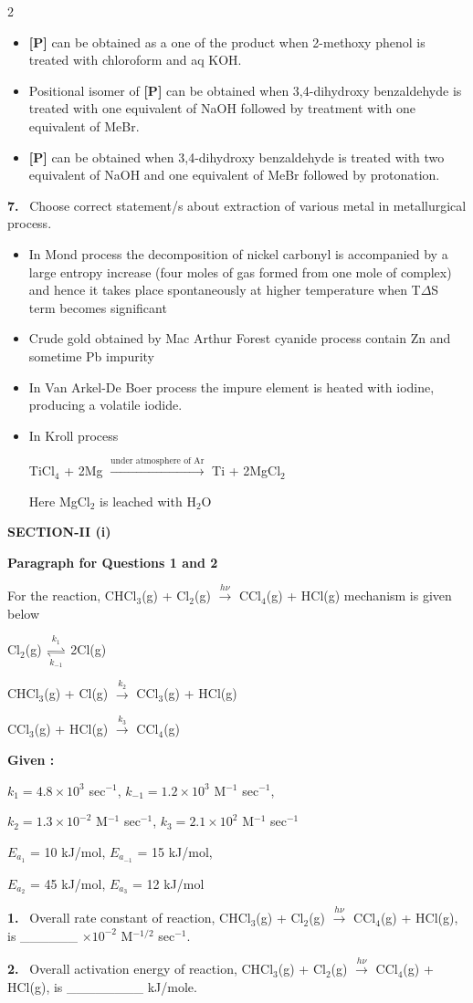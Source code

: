 \documentclass[10pt]{extarticle}
\newcommand{\sect}[1]{\par\smallskip\noindent\textbf{#1}\par}
\newcommand{\qn}[1]{\par\smallskip\noindent\textbf{#1.}~}
\newcommand{\paraq}[2]{\par\smallskip\noindent\textbf{Paragraph for Questions #1 and #2}\par}
\newenvironment{qoptions}{\begin{itemize}[leftmargin=1.8em,itemsep=1pt,topsep=2pt,label={}]}{\end{itemize}}
\newcommand{\opt}[2]{\item[(#1)] #2}
\begin{document}
\begin{multicols}{2}
\begin{qoptions}
\opt{B}{\textbf{[P]} can be obtained as a one of the product when 2-methoxy phenol is treated with chloroform and aq KOH.}
\opt{C}{Positional isomer of \textbf{[P]} can be obtained when 3,4-dihydroxy benzaldehyde is treated with one equivalent of NaOH followed by treatment with one equivalent of MeBr.}
\opt{D}{\textbf{[P]} can be obtained when 3,4-dihydroxy benzaldehyde is treated with two equivalent of NaOH and one equivalent of MeBr followed by protonation.}
\end{qoptions}
\qn{7} Choose correct statement/s about extraction of various metal in metallurgical process.
\begin{qoptions}
\opt{A}{In Mond process the decomposition of nickel carbonyl is accompanied by a large entropy increase (four moles of gas formed from one mole of complex) and hence it takes place spontaneously at higher temperature when T$\Delta$S term becomes significant}
\opt{B}{Crude gold obtained by Mac Arthur Forest cyanide process contain Zn and sometime Pb impurity}
\opt{C}{In Van Arkel-De Boer process the impure element is heated with iodine, producing a volatile iodide.}
\opt{D}{In Kroll process\par TiCl$_4$ + 2Mg $\xrightarrow{\text{under atmosphere of Ar}}$ Ti + 2MgCl$_2$\par Here MgCl$_2$ is leached with H$_2$O}
\end{qoptions}
\sect{SECTION-II (i)}
\paraq{1}{2}
For the reaction, CHCl$_3$(g) + Cl$_2$(g) $\xrightarrow{h\nu}$ CCl$_4$(g) + HCl(g) mechanism is given below\par
Cl$_2$(g) $\underset{k_{-1}}{\overset{k_1}{\rightleftharpoons}}$ 2Cl(g)\par
CHCl$_3$(g) + Cl(g) $\xrightarrow{k_2}$ CCl$_3$(g) + HCl(g)\par
CCl$_3$(g) + HCl(g) $\xrightarrow{k_3}$ CCl$_4$(g)\par
\textbf{Given :}\par
$k_1=4.8\times10^3$ sec$^{-1}$, $k_{-1}=1.2\times10^3$ M$^{-1}$ sec$^{-1}$,\par
$k_2=1.3\times10^{-2}$ M$^{-1}$ sec$^{-1}$, $k_3=2.1\times10^2$ M$^{-1}$ sec$^{-1}$\par
$E_{a_1}$ = 10 kJ/mol, $E_{a_{-1}}$ = 15 kJ/mol,\par
$E_{a_2}$ = 45 kJ/mol, $E_{a_3}$ = 12 kJ/mol
\qn{1} Overall rate constant of reaction, CHCl$_3$(g) + Cl$_2$(g) $\xrightarrow{h\nu}$ CCl$_4$(g) + HCl(g), is \_\_\_\_\_\_ $\times10^{-2}$ M$^{-1/2}$ sec$^{-1}$.
\qn{2} Overall activation energy of reaction, CHCl$_3$(g) + Cl$_2$(g) $\xrightarrow{h\nu}$ CCl$_4$(g) + HCl(g), is \_\_\_\_\_\_\_\_ kJ/mole.

\end{multicols}
\end{document}
